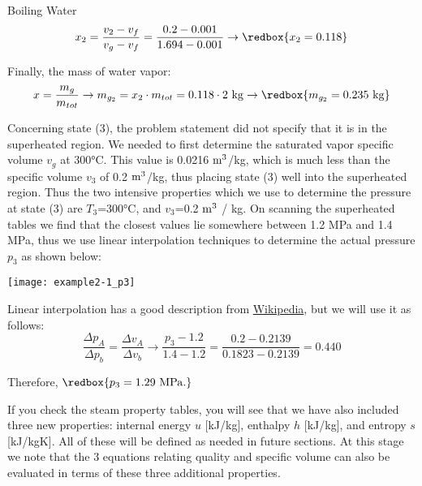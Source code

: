 \begin{example}{Boiling Water}
\begin{equation*}
  x_2 = \frac{v_2-v_f}{v_g-v_f} = \frac{0.2 - 0.001}{1.694-0.001}\rightarrow \redbox{x_2 = 0.118}
\end{equation*}

Finally, the mass of water vapor:
\begin{equation*}
  x = \frac{m_g}{m_{tot}} \rightarrow m_{g_2} = x_2\cdot m_{tot} = 0.118 \cdot 2\ {\rm kg} \rightarrow \redbox{m_{g_2} = 0.235\ {\rm kg}}
\end{equation*}

Concerning state (3), the problem statement did not specify that it is in the superheated region. We needed to first determine the saturated vapor specific volume $v_g$ at 300°C. This value is 0.0216 $\rm m^3$/kg, which is much less than the specific volume $v_3$ of 0.2 $\rm m^3$/kg, thus placing state (3) well into the superheated region. Thus the two intensive properties which we use to determine the pressure at state (3) are $T_3$=300°C, and $v_3$=0.2 $\rm m^3$ / kg. On scanning the superheated tables we find that the closest values lie somewhere between 1.2 MPa and 1.4 MPa, thus we use linear interpolation techniques to determine the actual pressure $p_3$ as shown below:

\begin{center}
\texttt{[image: example2-1\_p3]}
\end{center}

Linear interpolation has a good description from \href{https://en.wikipedia.org/wiki/Linear_interpolation}{Wikipedia}, but we will use it as follows:
\begin{equation*}
  \frac{\Delta p_A}{\Delta p_b} = \frac{\Delta v_A}{\Delta v_b} \rightarrow \frac{p_3 - 1.2}{1.4-1.2} = \frac{0.2-0.2139}{0.1823-0.2139} = 0.440
\end{equation*}

Therefore, $\redbox{p_3=1.29\ \rm MPa.}$

\end{example}

If you check the steam property tables, you will see that we have also included three new properties: internal energy $u$ [kJ/kg], enthalpy $h$ [kJ/kg], and entropy $s$ [kJ/kgK].  All of these will be defined as needed in future sections. At this stage we note that the 3 equations relating quality and specific volume can also be evaluated in terms of these three additional properties.


